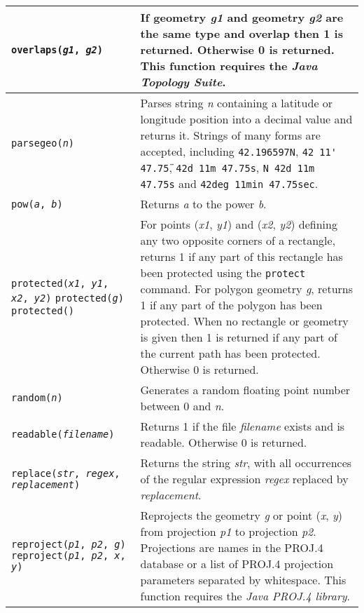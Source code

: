 \begin{longtable}{|p{5cm}|p{7cm}|}
\texttt{overlaps(\textit{g1}, \textit{g2})} &
If geometry \textit{g1} and geometry \textit{g2}
are the same type
and overlap
then 1 is returned.  Otherwise 0 is returned.
This function requires the \textit{Java Topology Suite}. \\

\hline

\texttt{parsegeo(\textit{n})} &
Parses string \textit{n} containing a latitude or longitude position
into a decimal value and returns it.  Strings of many forms are
accepted, including
\texttt{42.196597N}, \texttt{42\textdegree{} 11\'{} 47.75\"},
\texttt{42d 11m 47.75s},
\texttt{N 42d 11m 47.75s} and
\texttt{42deg 11min 47.75sec}. \\

\hline

\texttt{pow(\textit{a}, \textit{b})} &
Returns \textit{a} to the power \textit{b}. \\

\hline

\texttt{protected(\textit{x1}, \textit{y1}, \textit{x2}, \textit{y2})}
\texttt{protected(\textit{g})}
\texttt{protected()} &
For points
(\textit{x1}, \textit{y1}) and (\textit{x2}, \textit{y2}) defining
any two opposite corners of a rectangle, returns 1 if any part of
this rectangle has been protected using the \texttt{protect} command.
For polygon geometry \textit{g}, returns 1 if any part of the polygon
has been protected.
When no rectangle or geometry is given then 1 is returned if any
part of the current path has been protected.
Otherwise 0 is returned. \\

\hline

\texttt{random(\textit{n})} &
Generates a random floating point number between 0 and \textit{n}. \\

\hline

\texttt{readable(\textit{filename})} &
Returns 1 if the file \textit{filename} exists and is readable.
Otherwise 0 is returned. \\

\hline

\texttt{replace(\textit{str}, \textit{regex}, \textit{replacement})} &
Returns the string \textit{str}, with all occurrences of the regular
expression \textit{regex} replaced by \textit{replacement}. \\

\hline

\texttt{reproject(\textit{p1}, \textit{p2}, \textit{g})}
\texttt{reproject(\textit{p1}, \textit{p2}, \textit{x}, \textit{y})} &
Reprojects the geometry \textit{g} or point (\textit{x}, \textit{y})
from projection \textit{p1} to projection \textit{p2}.
Projections are names in the PROJ.4 database
or a list of PROJ.4 projection parameters separated by whitespace.
This function requires the \textit{Java PROJ.4 library}. \\


\end{longtable}
